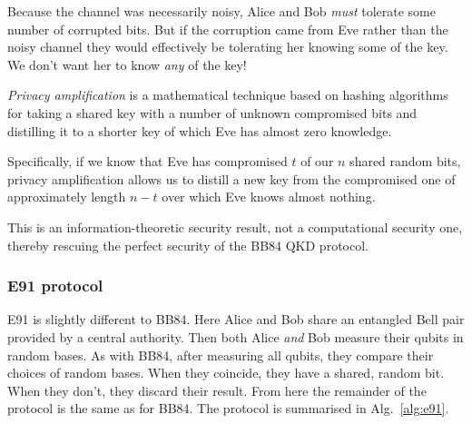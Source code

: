 Because the channel was necessarily noisy, Alice and Bob \textit{must} tolerate some number of corrupted bits. But if the corruption came from Eve rather than the noisy channel they would effectively be tolerating her knowing some of the key. We don't want her to know \textit{any} of the key!

\textit{Privacy amplification} is a mathematical technique based on hashing algorithms for taking a shared key with a number of unknown compromised bits and distilling it to a shorter key of which Eve has almost zero knowledge.

Specifically, if we know that Eve has compromised $t$ of our $n$ shared random bits, privacy amplification allows us to distill a new key from the compromised one of approximately length \mbox{$n-t$} over which Eve knows almost nothing.

This is an information-theoretic security result, not a computational security one, thereby rescuing the perfect security of the BB84 QKD protocol.

%
%

\subsubsection{E91 protocol}

E91 is slightly different to BB84. Here Alice and Bob share an entangled Bell pair provided by a central authority. Then both Alice \textit{and} Bob measure their qubits in random bases. As with BB84, after measuring all qubits, they compare their choices of random bases. When they coincide, they have a shared, random bit. When they don't, they discard their result. From here the remainder of the protocol is the same as for BB84. The protocol is summarised in Alg.~\ref{alg:e91}.


